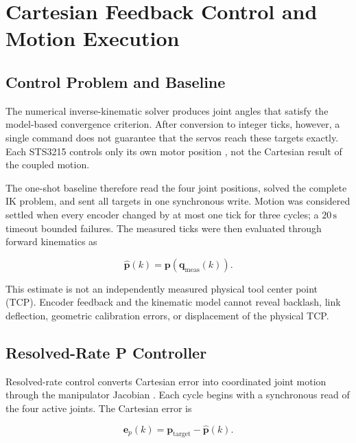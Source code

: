\section{Cartesian Feedback Control and Motion Execution}
\label{sec:feedback_control}

\subsection{Control Problem and Baseline}

The numerical inverse-kinematic solver produces joint angles that satisfy the
model-based convergence criterion. After conversion to integer ticks, however,
a single command does not guarantee that the servos reach these targets
exactly. Each STS3215 controls only its own motor position
\cite{feetech_protocol}, not the Cartesian result of the coupled motion.

The one-shot baseline therefore read the four joint positions, solved the
complete IK problem, and sent all targets in one synchronous write. Motion was
considered settled when every encoder changed by at most one tick for three
cycles; a \(20\,\mathrm{s}\) timeout bounded failures. The measured ticks were
then evaluated through forward kinematics as

\begin{equation}
    \hat{\mathbf{p}}(k)
    =
    \mathbf{p}\!\left(\mathbf{q}_{\mathrm{meas}}(k)\right).
    \label{eq:estimated_tcp}
\end{equation}

This estimate is not an independently measured physical tool center point
(TCP). Encoder feedback and the kinematic model cannot reveal backlash, link
deflection, geometric calibration errors, or displacement of the physical TCP.

\subsection{Resolved-Rate P Controller}

Resolved-rate control converts Cartesian error into coordinated joint motion
through the manipulator Jacobian \cite{whitney1969resolved}. Each cycle begins
with a synchronous read of the four active joints. The Cartesian error is

\begin{equation}
    \mathbf{e}_{p}(k)
    =
    \mathbf{p}_{\mathrm{target}}-\hat{\mathbf{p}}(k).
    \label{eq:resolved_rate_error}
\end{equation}

